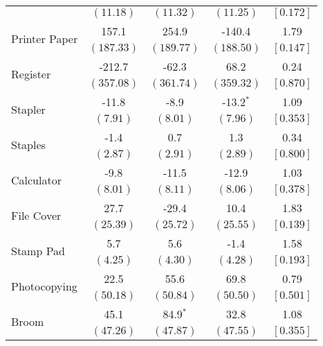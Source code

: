 \begin{tabular}{lcccc}
 & $ \left( 11.18\right) $  & $ \left( 11.32\right) $  & $ \left( 11.25\right) $  & $ \left[ 0.172\right] $  \\ [0.25em] 
 \multirow{2}{*}{Printer Paper}  &  157.1 &  254.9 & -140.4 &   1.79 \\ 
 & $ \left(187.33\right) $  & $ \left(189.77\right) $  & $ \left(188.50\right) $  & $ \left[ 0.147\right] $  \\ [0.25em] 
 \multirow{2}{*}{Register}  & -212.7 &  -62.3 &   68.2 &   0.24 \\ 
 & $ \left(357.08\right) $  & $ \left(361.74\right) $  & $ \left(359.32\right) $  & $ \left[ 0.870\right] $  \\ [0.25em] 
 \multirow{2}{*}{Stapler}  &  -11.8 &   -8.9 &  -13.2$^{*}$ &   1.09 \\ 
 & $ \left(  7.91\right) $  & $ \left(  8.01\right) $  & $ \left(  7.96\right) $  & $ \left[ 0.353\right] $  \\ [0.25em] 
 \multirow{2}{*}{Staples}  &   -1.4 &    0.7 &    1.3 &   0.34 \\ 
 & $ \left(  2.87\right) $  & $ \left(  2.91\right) $  & $ \left(  2.89\right) $  & $ \left[ 0.800\right] $  \\ [0.25em] 
 \multirow{2}{*}{Calculator}  &   -9.8 &  -11.5 &  -12.9 &   1.03 \\ 
 & $ \left(  8.01\right) $  & $ \left(  8.11\right) $  & $ \left(  8.06\right) $  & $ \left[ 0.378\right] $  \\ [0.25em] 
 \multirow{2}{*}{File Cover}  &   27.7 &  -29.4 &   10.4 &   1.83 \\ 
 & $ \left( 25.39\right) $  & $ \left( 25.72\right) $  & $ \left( 25.55\right) $  & $ \left[ 0.139\right] $  \\ [0.25em] 
 \multirow{2}{*}{Stamp Pad}  &    5.7 &    5.6 &   -1.4 &   1.58 \\ 
 & $ \left(  4.25\right) $  & $ \left(  4.30\right) $  & $ \left(  4.28\right) $  & $ \left[ 0.193\right] $  \\ [0.25em] 
 \multirow{2}{*}{Photocopying}  &   22.5 &   55.6 &   69.8 &   0.79 \\ 
 & $ \left( 50.18\right) $  & $ \left( 50.84\right) $  & $ \left( 50.50\right) $  & $ \left[ 0.501\right] $  \\ [0.25em] 
 \multirow{2}{*}{Broom}  &   45.1 &   84.9$^{*}$ &   32.8 &   1.08 \\ 
 & $ \left( 47.26\right) $  & $ \left( 47.87\right) $  & $ \left( 47.55\right) $  & $ \left[ 0.355\right] $  \\ [0.25em] 

\end{tabular}

